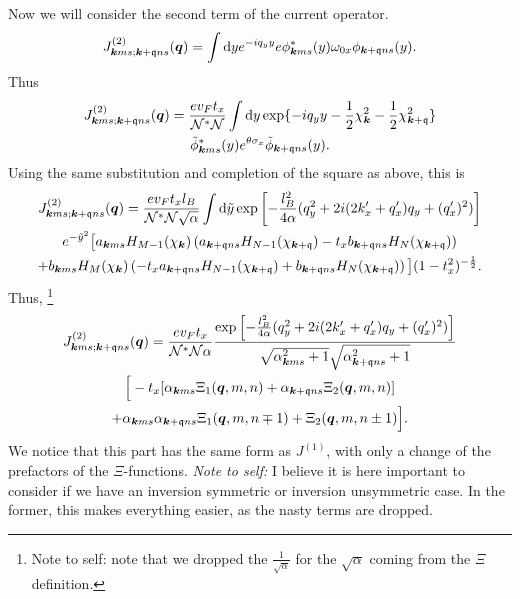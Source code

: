 Now we will consider the second term of the current operator.
\begin{equation}
  \label{eq:37}
  J_{\bm{k} m s; \bm{k} + \mathfrak{q} n s}^{(2)} (\bm{q}) =
  \int \mathrm{d} y
  e^{-iq_{y} y} e
  \phi ^{*}_{\bm{k} m s}(y) \omega _{0 x} \phi _{\bm{k} + \mathfrak{q} n s}(y).
\end{equation}
Thus
\begin{multline}
  \label{eq:38}
  J_{\bm{k} m s; \bm{k} + \mathfrak{q} n s}^{(2)} (\bm{q}) =
  \frac{e v_F t_x }{\mathcal{N}^{*} \mathcal{N}}
  \int \mathrm{d} y
  \exp\{-i q_{y} y - \frac{1}{2} \chi_{\bm{k}} ^2 - \frac{1}{2} \chi _{\bm{k} + \mathfrak{q}}^2\} \\
  \tilde{\phi} ^{*}_{\bm{k} m s}(y) e^{\theta \sigma _{x}} \tilde{\phi} _{\bm{k} + \mathfrak{q} n s}(y).
\end{multline}
Using the same substitution and completion of the square as above, this is
\begin{multline}
  \label{eq:39}
  J_{\bm{k} m s; \bm{k} + \mathfrak{q} n s}^{(2)} (\bm{q}) =
  \frac{e v_F t_x l_{B}}{\mathcal{N}^{*} \mathcal{N} \sqrt{\alpha}}
  \int \mathrm{d} \tilde{y}
    \exp \left[
      -\frac{l_{B}^2}{4 \alpha } (q_{y}^2 + 2i (2 k'_x + q' _x) q_{y}  + (q'_x)^2 )
    \right]\\
  e^{-\tilde{y}^2} \big[
    a_{\bm{k} m s} H_{M-1}( \chi _{\bm{k}} ) \left(a_{\bm{k} + \mathfrak{q} n s} H_{N-1}( \chi _{\bm{k} + \mathfrak{q}} ) - t_{x} b_{\bm{k} + \mathfrak{q} n s} H_{N}( \chi _{\bm{k} + \mathfrak{q}} ) \right)\\
   +
    b_{\bm{k} m s} H_{M}( \chi _{\bm{k}} ) \left(-t_{x} a_{\bm{k} + \mathfrak{q} n s} H_{N-1}( \chi _{\bm{k} + \mathfrak{q}} ) + b_{\bm{k} + \mathfrak{q} n s} H_{N}( \chi _{\bm{k} + \mathfrak{q}} ) \right)
    \big]
    (1 - t_{x}^2)^{-\frac{1}{2}}.
\end{multline}
Thus,
\footnote{Note to self: note that we dropped the \( \frac{1}{\sqrt{\alpha } } \) for the \( \sqrt{\alpha }  \) coming from the \( \Xi  \) definition.}
\begin{multline}
  J_{\bm{k} m s; \bm{k} + \mathfrak{q} n s}^{(2)} (\bm{q}) =
  \frac{e v_F t_x }{\mathcal{N}^{*} \mathcal{N} \alpha }
  \frac{
    \exp \left[
      -\frac{l_{B}^2}{4 \alpha } (q_{y}^2 + 2i (2 k' _x + q' _x) q_{y} + (q'_x)^2 )
    \right]
  }{
    \sqrt{\alpha_{\bm{k} m s}^2 + 1} \sqrt{\alpha _{\bm{k}+\mathfrak{q} n s}^2 + 1}
  }\\
  \Big[
  -t_x [ \alpha_{\bm{k} m s} \Xi_1(\bm{q}, m, n) + \alpha_{\bm{k} + \mathfrak{q} n s} \Xi_2(\bm{q}, m, n) ]\\
  + \alpha_{\bm{k} m s} \alpha_{\bm{k} + \mathfrak{q} ns} \Xi_1(\bm{q}, m, n\mp 1)
  + \Xi_2(\bm{q}, m, n \pm 1) \Big].
\end{multline}
We notice that this part has the same form as \( J^{(1)} \), with only a change of the prefactors of the \( \Xi  \)-functions.
\emph{Note to self: } I believe it is here important to consider if we have an inversion symmetric or inversion unsymmetric case. In the former, this makes everything easier, as the nasty terms are dropped.

